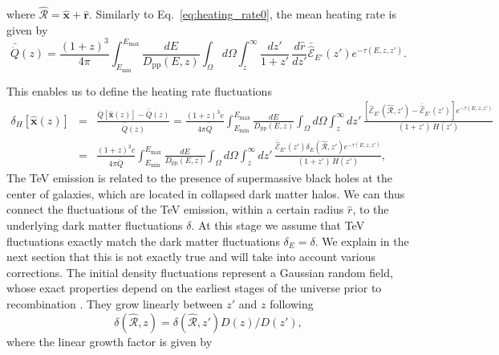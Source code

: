 \documentclass[numberedappendix]{emulateapj}
\begin{document}
{\begin{equation}
\end{equation}
where $\mathbf{\hat{\mathcal{R}}} = \mathbf{\hat{x}} + \mathbf{\hat{r}}$. Similarly to Eq.~\eqref{eq:heating_rate0}, the mean heating rate is given by
\begin{equation}
\label{eq:mean_exp_heat}
\bar{\dot{Q}} (z)=\frac{(1+z)^3}{4\pi}\int_{E_{\mathrm{min}}}^{E_{\mathrm{max}}} \frac{dE}{D_{\mathrm{pp}}(E, z)}\int_{\Omega}d\Omega\int_z^{\infty} \frac{d z'}{1+z'}\, \frac{d\hat r}{dz'}\bar{\hat{\mathcal{E}}}_{E'}(z') e^{-\tau(E,z,z')}.
\end{equation}

This enables us to define the heating rate fluctuations
\begin{eqnarray}
\label{eq:fluc_exp0}
\delta_H[\mathbf{\hat{x}}(z)]&=&\frac{\dot{Q}[\mathbf{\hat{x}}(z)]-\bar{\dot{Q}}(z)}{\bar{\dot{Q}}(z)}=\frac{(1+z)^3c}{4\pi\bar{\dot{Q}}} \int_{E_{\mathrm{min}}}^{E_{\mathrm{max}}}\frac{dE}{D_{\mathrm{pp}}(E,z)}\int_{\Omega}d\Omega\int_z^{\infty} d z'\,\frac{ \left[ \mathcal{\hat E}_{E'}(\mathbf{\hat{\mathcal{R}}}, z')-\bar{\hat{\mathcal{E}}}_{E'}(z')\right] e^{-\tau(E,z,z')}}{(1+z')\,H(z')} \nonumber\\ 
&=&\frac{(1+z)^3 c}{4\pi\bar{\dot{Q}}} \int_{E_{\mathrm{min}}}^{E_{\mathrm{max}}} \frac{dE}{D_{\mathrm{pp}}(E,z)}\int_{\Omega}d\Omega\int_z^{\infty} d z'\, \frac{\bar{\hat{\mathcal{E}}}_{E'}(z')\delta_E(\mathbf{\hat{\mathcal{R}}}, z') e^{-\tau(E,z,z')}}{(1+z')\,H(z')},
\end{eqnarray}
The TeV emission is related to the presence of supermassive black holes at the center of galaxies, which are located in collapsed dark matter halos. We can thus connect the fluctuations of the TeV emission, within a certain radius $\hat r$, to the underlying dark matter fluctuations $\delta$.
At this stage we assume that TeV fluctuations exactly match the dark matter fluctuations $\delta_E=\delta$. We explain in the next section that this is not exactly true and will take into account various corrections. The initial density fluctuations represent a Gaussian random field, whose exact properties depend on the earliest stages of the universe prior to recombination \citep{1986ApJ...304...15B,Peebles}. They grow linearly between $z'$ and $z$ following  \citep{ 1977MNRAS.179..351H}
\begin{equation}
  \label{eq:growth}
\delta(\mathbf{\hat{\mathcal{R}}}, z)=\delta(\mathbf{\hat{\mathcal{R}}}, z')D(z)/D(z'),
\end{equation}
where the linear growth factor is given by
\begin{equation}

\end{equation}}
\end{document}
